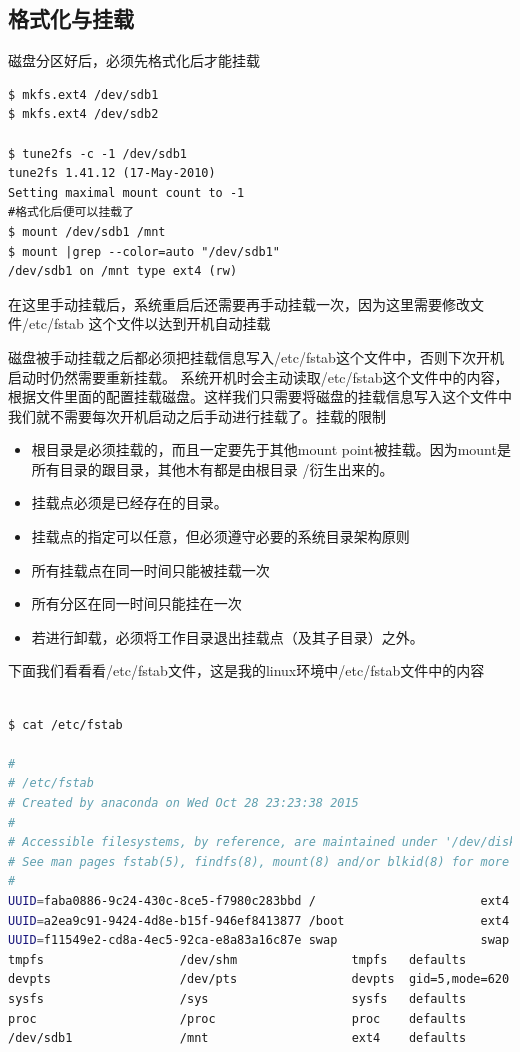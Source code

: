 \subsection{ 格式化与挂载}
磁盘分区好后，必须先格式化后才能挂载

\begin{lstlisting}
$ mkfs.ext4 /dev/sdb1
$ mkfs.ext4 /dev/sdb2

$ tune2fs -c -1 /dev/sdb1
tune2fs 1.41.12 (17-May-2010)
Setting maximal mount count to -1
#格式化后便可以挂载了
$ mount /dev/sdb1 /mnt
$ mount |grep --color=auto "/dev/sdb1"
/dev/sdb1 on /mnt type ext4 (rw)
\end{lstlisting}

在这里手动挂载后，系统重启后还需要再手动挂载一次，因为这里需要修改文件/etc/fstab 这个文件以达到开机自动挂载

磁盘被手动挂载之后都必须把挂载信息写入/etc/fstab这个文件中，否则下次开机启动时仍然需要重新挂载。 系统开机时会主动读取/etc/fstab这个文件中的内容，根据文件里面的配置挂载磁盘。这样我们只需要将磁盘的挂载信息写入这个文件中我们就不需要每次开机启动之后手动进行挂载了。挂载的限制
\begin{itemize}
\item  根目录是必须挂载的，而且一定要先于其他mount point被挂载。因为mount是所有目录的跟目录，其他木有都是由根目录 /衍生出来的。
\item  挂载点必须是已经存在的目录。
\item  挂载点的指定可以任意，但必须遵守必要的系统目录架构原则
\item  所有挂载点在同一时间只能被挂载一次
\item  所有分区在同一时间只能挂在一次
\item  若进行卸载，必须将工作目录退出挂载点（及其子目录）之外。
\end{itemize}

下面我们看看看/etc/fstab文件，这是我的linux环境中/etc/fstab文件中的内容

\begin{lstlisting}[language=bash]

$ cat /etc/fstab

#
# /etc/fstab
# Created by anaconda on Wed Oct 28 23:23:38 2015
#
# Accessible filesystems, by reference, are maintained under '/dev/disk'
# See man pages fstab(5), findfs(8), mount(8) and/or blkid(8) for more info
#
UUID=faba0886-9c24-430c-8ce5-f7980c283bbd /                       ext4    defaults        1 1
UUID=a2ea9c91-9424-4d8e-b15f-946ef8413877 /boot                   ext4    defaults        1 2
UUID=f11549e2-cd8a-4ec5-92ca-e8a83a16c87e swap                    swap    defaults        0 0
tmpfs                   /dev/shm                tmpfs   defaults        0 0
devpts                  /dev/pts                devpts  gid=5,mode=620  0 0
sysfs                   /sys                    sysfs   defaults        0 0
proc                    /proc                   proc    defaults        0 0
/dev/sdb1               /mnt                    ext4    defaults        0 0

\end{lstlisting}

